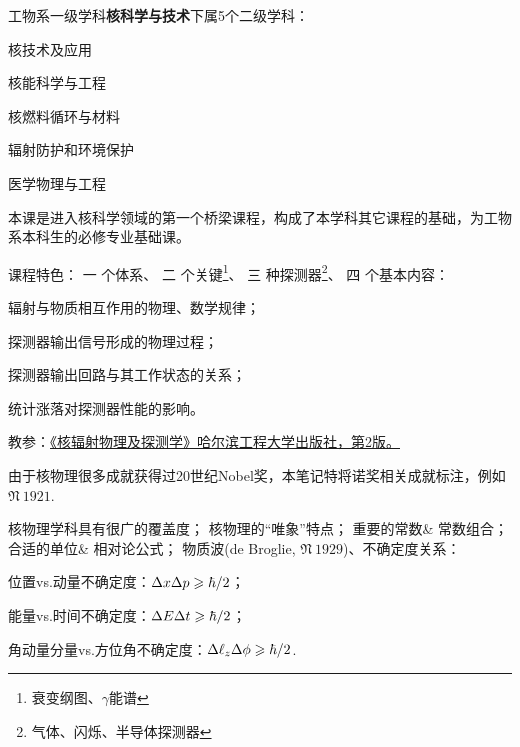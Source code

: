 \def\coursename{核辐射物理}
\def\coursefullname{核辐射物理及探测学}
\def\courseEnglishname{Nuclear Radiation Physics and Detection}
\def\teachername{杨祎罡}
\def\beginday{2022/9/30}



\usepackage{textgreek}

\newcommand{\nucli}[2]{{^{#1}\mathrm{#2}}}
\newcommand{\nuc}[1]{\mathrm{#1}}
\newcommand{\reac}[4]{{\nuc #1}(#2,#3){\nuc #4}}
\newcommand*{\ini}{\mathrm{i}}
\newcommand*{\fin}{\mathrm{f}}
\newcommand*{\thres}{\mathrm{th}}
\newcommand{\nobel}[1]{$\mathfrak{N}~#1$}
\newcommand*{\CM}{_{\mathrm C}}
\newcommand*{\LAB}{_{\mathrm L}}
\newcommand*{\lambdabar}{{^{_-}\!\!\!\!\lambda}}
\newcommand*{\barlambda}{{^-\!\!\!\!\lambda}}
\newcommand*{\sca}{{\mathrm{sc}}}
\newcommand*{\dep}{_{\mathrm{dep}}}

\makeindex[title=索引]


\firstandforemost

工物系一级学科\textbf{核科学与技术}下属5个二级学科：
\begin{compactitem}
	\item 核技术及应用
	\item 核能科学与工程
	\item 核燃料循环与材料
	\item 辐射防护和环境保护
	\item 医学物理与工程
\end{compactitem}

本课是进入核科学领域的第一个桥梁课程，构成了本学科其它课程的基础，为工物系本科生的必修专业基础课。

课程特色：
一 个体系、
二 个关键\footnote{衰变纲图、$\gamma$能谱}、
三 种探测器\footnote{气体、闪烁、半导体探测器}、
四 个基本内容：
\begin{compactenum}
	\item 辐射与物质相互作用的物理、数学规律；
	\item 探测器输出信号形成的物理过程；
	\item 探测器输出回路与其工作状态的关系；
	\item 统计涨落对探测器性能的影响。
\end{compactenum}
教参：\href{http://reserves.lib.tsinghua.edu.cn/Search/BookDetail?bookId=bcac7c78-bf4c-4bfd-9ecc-f1b6f47e6b10}{《核辐射物理及探测学》哈尔滨工程大学出版社，第2版。}

由于核物理很多成就获得过20世纪Nobel奖，本笔记特将诺奖相关成就标注，例如\nobel{1921}.

核物理学科具有很广的覆盖度；
核物理的“唯象”特点；
重要的常数\& 常数组合；
合适的单位\& 相对论公式；
物质波(de Broglie, \nobel{1929})、不确定度关系：
\begin{compactenum}
	\item 位置vs.动量不确定度：$\Delta x\Delta p\geqslant\hbar/2$；
	\item 能量vs.时间不确定度：$\Delta E\Delta t\geqslant\hbar/2$；
	\item 角动量分量vs.方位角不确定度：$\Delta \ell_z\Delta\phi\geqslant\hbar/2$.
\end{compactenum}
\clearpage
